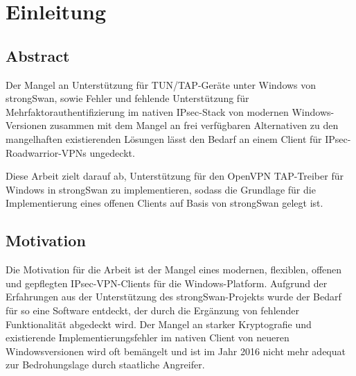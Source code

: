 


\section{Einleitung}
\subsection{Abstract}
Der Mangel an Unterstützung für TUN/TAP-Geräte unter Windows von strongSwan, sowie Fehler und
fehlende Unterstützung für Mehrfaktorauthentifizierung im nativen IPsec-Stack von modernen
Windows-Versionen zusammen mit dem Mangel an frei verfügbaren Alternativen zu den mangelhaften existierenden Lösungen
lässt den Bedarf an einem Client für IPsec-Roadwarrior-VPNs ungedeckt.

Diese Arbeit zielt darauf ab, Unterstützung für den OpenVPN TAP-Treiber
für Windows in strongSwan zu implementieren, sodass die Grundlage für die Implementierung
eines offenen Clients auf Basis von strongSwan gelegt ist.

\subsection{Motivation}
Die Motivation für die Arbeit ist der Mangel eines modernen, flexiblen, offenen
und  gepflegten IPsec-VPN-Clients für die Windows-Platform.
Aufgrund der Erfahrungen aus der Unterstützung des strongSwan-Projekts wurde
der Bedarf für so eine Software entdeckt, der durch die Ergänzung von fehlender
Funktionalität abgedeckt wird.
Der Mangel an starker Kryptografie und existierende Implementierungsfehler im nativen Client
von neueren Windowsversionen wird oft bemängelt und ist im Jahr 2016 nicht mehr adequat
zur Bedrohungslage durch staatliche Angreifer.

\BlankPage
{}

